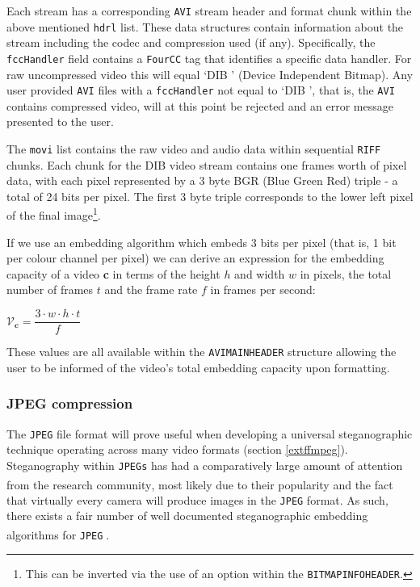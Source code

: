 \documentclass[paper=a4, fontsize=11pt,twoside]{scrartcl}
\numberwithin{table}{section}
\numberwithin{figure}{section}
\numberwithin{algorithm}{section}
\begin{document}
\noindent
Each stream has a corresponding \texttt{AVI} stream header and format chunk within the above mentioned \texttt{hdrl} list. These data structures contain information about the stream including the codec and compression used (if any). Specifically, the \texttt{fccHandler} field contains a \texttt{FourCC} tag that identifies a specific data handler. For raw uncompressed video this will equal `DIB ' (Device Independent Bitmap). Any user provided \texttt{AVI} files with a \texttt{fccHandler} not equal to `DIB ', that is, the \texttt{AVI} contains compressed video, will at this point be rejected and an error message presented to the user.

The \texttt{movi} list contains the raw video and audio data within sequential \texttt{RIFF} chunks. Each chunk for the DIB video stream contains one frames worth of pixel data, with each pixel represented by a 3 byte BGR (Blue Green Red) triple - a total of 24 bits per pixel. The first 3 byte triple corresponds to the lower left pixel of the final image\footnote{This can be inverted via the use of an option within the \texttt{BITMAPINFOHEADER}.}. 

If we use an embedding algorithm which embeds 3 bits per pixel (that is, 1 bit per colour channel per pixel) we can derive an expression for the embedding capacity of a video \textbf{c} in terms of the height $h$ and width $w$ in pixels, the total number of frames $t$ and the frame rate $f$ in frames per second:
\begin{center}
	$\mathcal{V} _{\textbf{c}} = \dfrac{3 \cdot w \cdot h \cdot t}{f}$
\end{center}

\noindent
These values are all available within the \texttt{AVIMAINHEADER} structure allowing the user to be informed of the video's total embedding capacity upon formatting.

\subsubsection{JPEG compression}
\label{jpeg}

The \texttt{JPEG} file format will prove useful when developing a universal steganographic technique operating across many video formats (section \ref{extffmpeg}). Steganography within \texttt{JPEGs} has had a comparatively large amount of attention from the research community\textsuperscript{\cite{jpegsteg}}, most likely due to their popularity and the fact that virtually every camera will produce images in the \texttt{JPEG} format. As such, there exists a fair number of well documented steganographic embedding algorithms for \texttt{JPEG}\textsuperscript{\cite{jsteg} \cite{f5} \cite{outguess}}.
\end{document}
